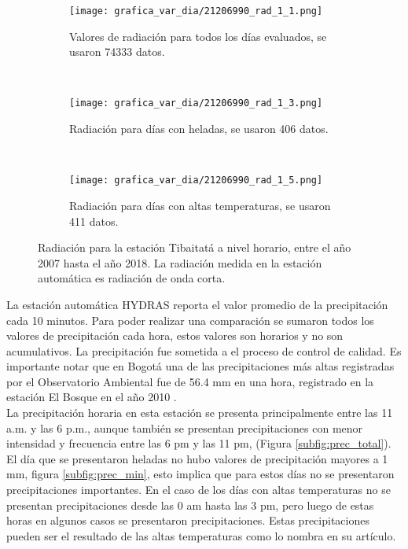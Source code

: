 \begin{figure}[H]
    \centering
    \begin{subfigure}[b]{0.45\textwidth}
    \caption{Valores de radiación para todos los días evaluados, se usaron 74333 datos.}
	\texttt{[image: grafica\_var\_dia/21206990\_rad\_1\_1.png]}
    \label{subfig:rad_total}
	\end{subfigure}
	~
    \begin{subfigure}[b]{0.45\textwidth}
    \caption{Radiación para días con heladas, se usaron 406 datos.}
	\texttt{[image: grafica\_var\_dia/21206990\_rad\_1\_3.png]}
    \label{subfig:rad_min}
	\end{subfigure}
		~
    \begin{subfigure}[b]{0.45\textwidth}
    \caption{Radiación para días con altas temperaturas, se usaron 411 datos.}
	\texttt{[image: grafica\_var\_dia/21206990\_rad\_1\_5.png]}
    \label{subfig:rad_max}
	\end{subfigure}
	
	\caption{Radiación para la estación Tibaitatá a nivel horario, entre el año 2007 hasta el año 2018. La radiación medida en la estación automática es radiación de onda corta.}
    \label{fig:rad_tibaitata}
\end{figure}


La estación automática HYDRAS reporta el valor promedio de la precipitación cada 10 minutos. Para poder realizar una comparación se sumaron todos los valores de precipitación cada hora, estos valores son horarios y no son acumulativos. La precipitación fue sometida a el proceso de control de calidad. Es importante notar que en Bogotá una de las precipitaciones más altas registradas por el Observatorio Ambiental fue de 56.4 mm en una hora, registrado en la estación El Bosque en el año 2010 \citep{OAB2011}.\\

La precipitación horaria en esta estación se presenta principalmente entre las 11 a.m. y las 6 p.m., aunque también se presentan precipitaciones con menor intensidad y frecuencia entre las 6 pm y las 11 pm, (Figura \ref{subfig:prec_total}). El día que se presentaron heladas no hubo valores de precipitación mayores a 1 mm, figura \ref{subfig:prec_min}, esto implica que para estos días no se presentaron precipitaciones importantes. En el caso de los días con altas temperaturas no se presentan precipitaciones desde las 0 am hasta las 3 pm, pero luego de estas horas en algunos casos se presentaron precipitaciones. Estas precipitaciones pueden ser el resultado de las altas temperaturas como lo nombra \citet{Fischer2015} en su artículo.

